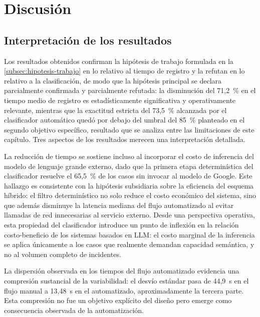 \section{Discusión}\label{sec:discusion}

\subsection{Interpretación de los resultados}\label{subsec:interpretacion-resultados}

Los resultados obtenidos confirman la hipótesis de trabajo formulada en la \autoref{subsec:hipotesis-trabajo} en lo relativo al tiempo de registro y la refutan en lo relativo a la clasificación, de modo que la hipótesis principal se declara parcialmente confirmada y parcialmente refutada: la disminución del 71,2~\% en el tiempo medio de registro es estadísticamente significativa y operativamente relevante, mientras que la exactitud estricta del 73,5~\% alcanzada por el clasificador automático quedó por debajo del umbral del 85~\% planteado en el segundo objetivo específico, resultado que se analiza entre las limitaciones de este capítulo. Tres aspectos de los resultados merecen una interpretación detallada.

La reducción de tiempo se sostiene incluso al incorporar el costo de inferencia del modelo de lenguaje grande externo, dado que la primera etapa determinística del clasificador resuelve el 65,5~\% de los casos sin invocar al modelo de Google. Este hallazgo es consistente con la hipótesis subsidiaria sobre la eficiencia del esquema híbrido: el filtro determinístico no solo reduce el costo económico del sistema, sino que además disminuye la latencia mediana del flujo automatizado al evitar llamadas de red innecesarias al servicio externo. Desde una perspectiva operativa, esta propiedad del clasificador introduce un punto de inflexión en la relación costo-beneficio de los sistemas basados en LLM: el costo marginal de la inferencia se aplica únicamente a los casos que realmente demandan capacidad semántica, y no al volumen completo de incidentes.

La dispersión observada en los tiempos del flujo automatizado evidencia una compresión sustancial de la variabilidad: el desvío estándar pasa de 44,9~s en el flujo manual a 13,48~s en el automatizado, aproximadamente la tercera parte. Esta compresión no fue un objetivo explícito del diseño pero emerge como consecuencia observada de la automatización.

